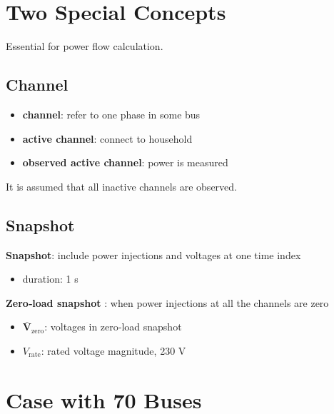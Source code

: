 \documentclass[
]{book}
\providecommand{\tightlist}{%
  \setlength{\itemsep}{0pt}\setlength{\parskip}{0pt}}
\begin{document}
\hypertarget{concepts}{%
\section{Two Special Concepts}\label{concepts}}

Essential for power flow calculation.

\hypertarget{channel}{%
\subsection*{Channel}\label{channel}}

\begin{itemize}
\tightlist
\item
  \textbf{channel}: refer to one phase in some bus
\item
  \textbf{active channel}: connect to household
\item
  \textbf{observed active channel}: power is measured
\end{itemize}

It is assumed that all inactive channels are observed.

\hypertarget{snapshot}{%
\subsection*{Snapshot}\label{snapshot}}

\textbf{Snapshot}: include power injections and voltages at one time index

\begin{itemize}
\tightlist
\item
  duration: 1 s
\end{itemize}

\textbf{Zero‐load snapshot} : when power injections at all the channels are zero

\begin{itemize}
\tightlist
\item
  \(\boldsymbol{\bar{V}}_\text{zero}\): voltages in zero‐load snapshot
\item
  \(V_\text{rate}\): rated voltage magnitude, 230 V
\end{itemize}

\hypertarget{case}{%
\section{Case with 70 Buses}\label{case}}
\end{document}
